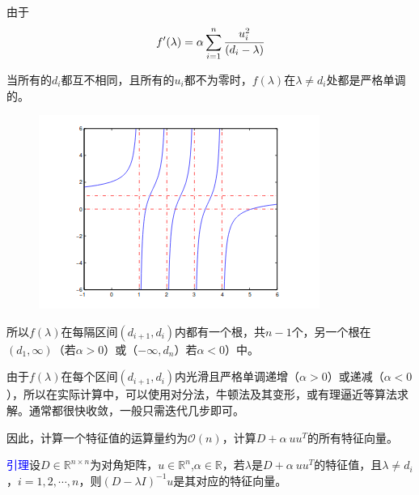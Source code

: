 \documentclass[notheorems,serif]{beamer}
\begin{document}
\begin{frame}
由于$$f'(\lambda)=\alpha \sum_{i=1}^{n}\cfrac{u_i^2}{(d_i-\lambda)}$$

当所有的$d_i$都互不相同，且所有的$u_i$都不为零时，$f(\lambda)$在$\lambda \neq d_i$处都是严格单调的。
\begin{figure}[H]
	\centering
	\includegraphics[scale=0.6]{figurest/figure_2.png}
\end{figure}
\end{frame}
\begin{frame}
所以$f(\lambda)$在每隔区间$(d_{i+1},d_i)$内都有一个根，共$n-1$个，另一个根在$(d_1,\infty)$（若$\alpha >0$）或（$-\infty,d_n$）若$\alpha <0$）中。

由于$f(\lambda)$在每个区间$(d_{i+1},d_i)$内光滑且严格单调递增（$\alpha >0$）或递减（$\alpha <0$），所以在实际计算中，可以使用对分法，牛顿法及其变形，或有理逼近等算法求解。通常都很快收敛，一般只需迭代几步即可。

因此，计算一个特征值的运算量约为$\mathcal{O}(n)$，计算$D+\alpha\ uu^T$的所有特征向量。

\textcolor{blue}{引理}\quad 设$D\in \mathbb R^{n\times n}$为对角矩阵，$u\in \mathbb R^n$,$\alpha \in \mathbb R$，若$\lambda$是$D+\alpha\ uu^T$的特征值，且$\lambda \neq d_i$，$i=1,2,\cdots ,n$，则$(D-\lambda I)^{-1}u$是其对应的特征向量。\\
\end{frame}
\end{document}
